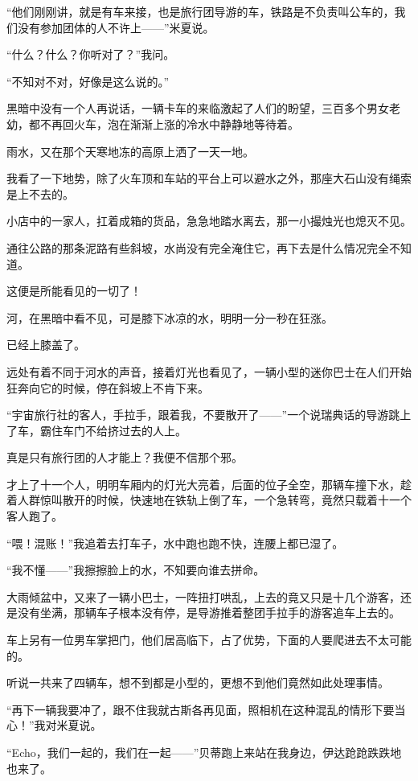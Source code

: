 \par “他们刚刚讲，就是有车来接，也是旅行团导游的车，铁路是不负责叫公车的，我们没有参加团体的人不许上——”米夏说。
\par “什么？什么？你听对了？”我问。
\par “不知对不对，好像是这么说的。”
\par 黑暗中没有一个人再说话，一辆卡车的来临激起了人们的盼望，三百多个男女老幼，都不再回火车，泡在渐渐上涨的冷水中静静地等待着。
\par 雨水，又在那个天寒地冻的高原上洒了一天一地。
\par 我看了一下地势，除了火车顶和车站的平台上可以避水之外，那座大石山没有绳索是上不去的。
\par 小店中的一家人，扛着成箱的货品，急急地踏水离去，那一小撮烛光也熄灭不见。
\par 通往公路的那条泥路有些斜坡，水尚没有完全淹住它，再下去是什么情况完全不知道。
\par 这便是所能看见的一切了！
\par 河，在黑暗中看不见，可是膝下冰凉的水，明明一分一秒在狂涨。
\par 已经上膝盖了。
\par 远处有着不同于河水的声音，接着灯光也看见了，一辆小型的迷你巴士在人们开始狂奔向它的时候，停在斜坡上不肯下来。
\par “宇宙旅行社的客人，手拉手，跟着我，不要散开了——”一个说瑞典话的导游跳上了车，霸住车门不给挤过去的人上。
\par 真是只有旅行团的人才能上？我便不信那个邪。
\par 才上了十一个人，明明车厢内的灯光大亮着，后面的位子全空，那辆车撞下水，趁着人群惊叫散开的时候，快速地在铁轨上倒了车，一个急转弯，竟然只载着十一个客人跑了。
\par “喂！混账！”我追着去打车子，水中跑也跑不快，连腰上都已湿了。
\par “我不懂——”我擦擦脸上的水，不知要向谁去拼命。
\par 大雨倾盆中，又来了一辆小巴士，一阵扭打哄乱，上去的竟又只是十几个游客，还是没有坐满，那辆车子根本没有停，是导游推着整团手拉手的游客追车上去的。
\par 车上另有一位男车掌把门，他们居高临下，占了优势，下面的人要爬进去不太可能的。
\par 听说一共来了四辆车，想不到都是小型的，更想不到他们竟然如此处理事情。
\par “再下一辆我要冲了，跟不住我就古斯各再见面，照相机在这种混乱的情形下要当心！”我对米夏说。
\par “Echo，我们一起的，我们在一起——”贝蒂跑上来站在我身边，伊达跄跄跌跌地也来了。
